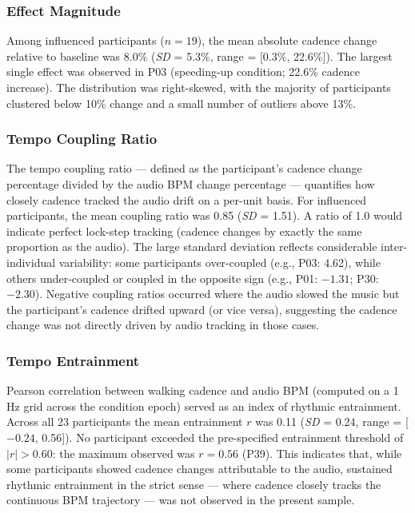\subsubsection{Effect Magnitude}

Among influenced participants ($n = 19$), the mean absolute cadence change
relative to baseline was \(8.0\%\) (\textit{SD} = 5.3\%,
range = [0.3\%, 22.6\%]). The largest single effect was observed in P03
(speeding-up condition; 22.6\% cadence increase). The distribution was
right-skewed, with the majority of participants clustered below 10\% change and
a small number of outliers above 13\%.

\subsubsection{Tempo Coupling Ratio}

The tempo coupling ratio --- defined as the participant's cadence change
percentage divided by the audio BPM change percentage --- quantifies how
closely cadence tracked the audio drift on a per-unit basis. For influenced
participants, the mean coupling ratio was 0.85 (\textit{SD} = 1.51). A ratio
of 1.0 would indicate perfect lock-step tracking (cadence changes by exactly
the same proportion as the audio). The large standard deviation reflects
considerable inter-individual variability: some participants over-coupled (e.g.,
P03: 4.62), while others under-coupled or coupled in the opposite sign
(e.g., P01: $-1.31$; P30: $-2.30$). Negative coupling ratios occurred where
the audio slowed the music but the participant's cadence drifted upward (or vice
versa), suggesting the cadence change was not directly driven by audio tracking
in those cases.

\subsubsection{Tempo Entrainment}

Pearson correlation between walking cadence and audio BPM (computed on a 1\,Hz
grid across the condition epoch) served as an index of rhythmic entrainment.
Across all 23 participants the mean entrainment $r$ was 0.11
(\textit{SD} = 0.24, range = [$-0.24$, 0.56]). No participant exceeded the
pre-specified entrainment threshold of $|r| > 0.60$: the maximum observed was
$r = 0.56$ (P39). This indicates that, while some participants showed cadence
changes attributable to the audio, sustained rhythmic entrainment in the strict
sense --- where cadence closely tracks the continuous BPM trajectory --- was not
observed in the present sample.

